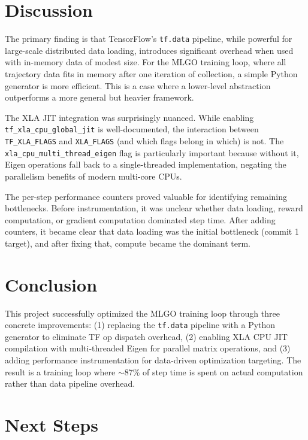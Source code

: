 \documentclass[10pt]{article}
\begin{document}
\section{Discussion}

The primary finding is that TensorFlow's \texttt{tf.data} pipeline, while powerful for large-scale distributed data loading, introduces significant overhead when used with in-memory data of modest size. For the MLGO training loop, where all trajectory data fits in memory after one iteration of collection, a simple Python generator is more efficient. This is a case where a lower-level abstraction outperforms a more general but heavier framework.

The XLA JIT integration was surprisingly nuanced. While enabling \texttt{tf\_xla\_cpu\_global\_jit} is well-documented, the interaction between \texttt{TF\_XLA\_FLAGS} and \texttt{XLA\_FLAGS} (and which flags belong in which) is not. The \texttt{xla\_cpu\_multi\_thread\_eigen} flag is particularly important because without it, Eigen operations fall back to a single-threaded implementation, negating the parallelism benefits of modern multi-core CPUs.

The per-step performance counters proved valuable for identifying remaining bottlenecks. Before instrumentation, it was unclear whether data loading, reward computation, or gradient computation dominated step time. After adding counters, it became clear that data loading was the initial bottleneck (commit 1 target), and after fixing that, compute became the dominant term.

\section{Conclusion}

This project successfully optimized the MLGO training loop through three concrete improvements: (1) replacing the \texttt{tf.data} pipeline with a Python generator to eliminate TF op dispatch overhead, (2) enabling XLA CPU JIT compilation with multi-threaded Eigen for parallel matrix operations, and (3) adding performance instrumentation for data-driven optimization targeting. The result is a training loop where $\sim$87\% of step time is spent on actual computation rather than data pipeline overhead.

\section{Next Steps}
\end{document}
